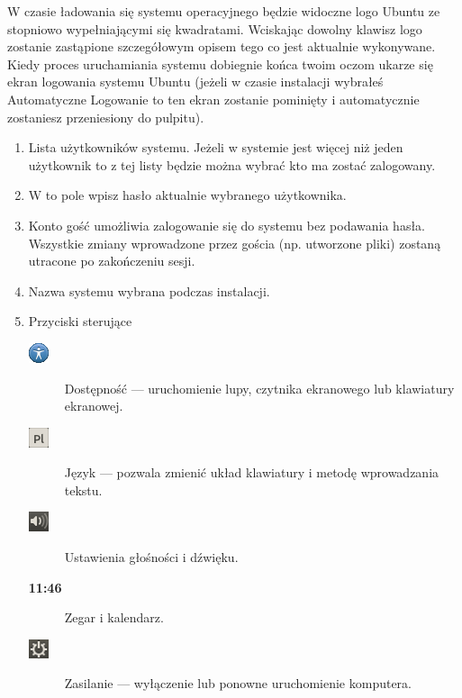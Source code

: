 W czasie ładowania się systemu operacyjnego będzie widoczne logo Ubuntu ze stopniowo wypełniającymi się kwadratami. Wciskając dowolny klawisz logo zostanie zastąpione szczegółowym opisem tego co jest aktualnie wykonywane.
Kiedy proces uruchamiania systemu dobiegnie końca twoim oczom ukarze się ekran logowania systemu Ubuntu (jeżeli w czasie instalacji wybrałeś \textcolor{ubuntu_orange}{Automatyczne Logowanie} to ten ekran zostanie pominięty i automatycznie zostaniesz przeniesiony do pulpitu).
\begin{enumerate}[label=\protect\circled{\arabic*}]
\item Lista użytkowników systemu. Jeżeli w systemie jest więcej niż jeden użytkownik to z tej listy będzie można wybrać kto ma zostać zalogowany.
\item W to pole wpisz hasło aktualnie wybranego użytkownika.
\item Konto gość umożliwia zalogowanie się do systemu bez podawania hasła. Wszystkie zmiany wprowadzone przez gościa (np. utworzone pliki) zostaną utracone po zakończeniu sesji.
\item Nazwa systemu wybrana podczas instalacji.
\item Przyciski sterujące
\begin{description}
\item[\includegraphics{images/ikony_dostempnosc.png}] \textcolor{ubuntu_orange}{Dostępność} --- uruchomienie lupy, czytnika ekranowego lub klawiatury ekranowej.
\item[\includegraphics{images/ikony_jezyk.png}] \textcolor{ubuntu_orange}{Język} --- pozwala zmienić układ klawiatury i metodę wprowadzania tekstu.
\item[\includegraphics{images/ikony_dzwiek.png}] \textcolor{ubuntu_orange}{Ustawienia głośności i dźwięku}.
\item[\textbf{11:46}] \textcolor{ubuntu_orange}{Zegar i kalendarz}.
\item[\includegraphics{images/ikony_zasilanie.png}] \textcolor{ubuntu_orange}{Zasilanie} --- wyłączenie lub ponowne uruchomienie komputera.
\end{description}
\end{enumerate}
\clearpage
